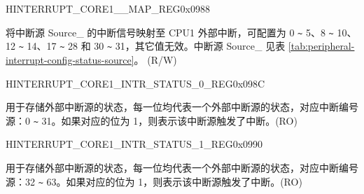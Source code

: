 \begin{register}{H}{INTERRUPT\_CORE1\_\_MAP\_REG}{0x{}0988}\label{regdesc:INTERRUPTCORE1DMAEXTMEMREJECTINTMAPREG}
%
%
\regnewline%
\begin{regdesc}\begin{reglist}
\item [INTERRUPT\_CORE1\_SOURCE\_\regindex{Y}\_MAP] 将中断源 Source\_ 的中断信号映射至 CPU1 外部中断，可配置为 0 \verb+~+ 5、8 \verb+~+ 10、12 \verb+~+ 14、17 \verb+~+ 28 和 30 \verb+~+ 31，其它值无效。中断源 Source\_ 见表 \ref{tab:peripheral-interrupt-config-status-source}。 (R/W)
\end{reglist}\end{regdesc}
\end{register} 

\begin{register}{H}{INTERRUPT\_CORE1\_INTR\_STATUS\_0\_REG}{0x{}098C}\label{regdesc:INTERRUPTCORE1INTRSTATUS0REG}
%
\regnewline%
\begin{regdesc}\begin{reglist}
\label{fielddesc:INTERRUPTCORE1INTRSTATUS0}\item [INTERRUPT\_CORE1\_INTR\_STATUS\_0] 用于存储外部中断源的状态，每一位均代表一个外部中断源的状态，对应中断编号源：0 \verb+~+ 31。如果对应的位为 1，则表示该中断源触发了中断。(RO)
\end{reglist}\end{regdesc}
\end{register}


\begin{register}{H}{INTERRUPT\_CORE1\_INTR\_STATUS\_1\_REG}{0x{}0990}\label{regdesc:INTERRUPTCORE1INTRSTATUS1REG}
%
\regnewline%
\begin{regdesc}\begin{reglist}
\label{fielddesc:INTERRUPTCORE1INTRSTATUS1}\item [INTERRUPT\_CORE1\_INTR\_STATUS\_1] 用于存储外部中断源的状态，每一位均代表一个外部中断源的状态，对应中断编号源：32 \verb+~+ 63。如果对应的位为 1，则表示该中断源触发了中断。(RO)
\end{reglist}\end{regdesc}
\end{register}


